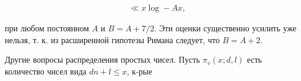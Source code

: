 \documentclass[10pt]{article}
\begin{document}
\[

\begin{aligned}

& \ll x \log -A x,

\end{aligned}

\]



при любом постоянном $A$ и $B=A+7 / 2$. Эти оценки существенно усилить уже нельзя, т. к. из расширенной гипотезы Римана следует, что $B=A+2$.



Другие вопросы распределения простых чисел. Пусть $\pi_{v}(x ; d, l)$ есть количество чисел вида $d n+l \leqslant x$, к-рые
\end{document}
